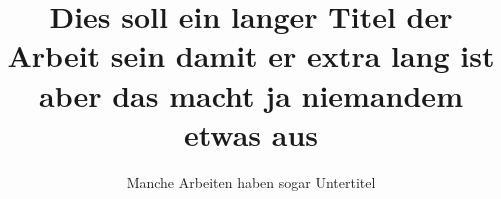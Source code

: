 \documentclass[online,a4paper]{isw}
\begin{document}
    \frontmatter
    
    \maketitle
    
    \begin{otherlanguage}{ngerman}
        \title{Dies soll ein langer Titel der Arbeit sein damit er extra lang ist aber das macht ja niemandem etwas aus}
        \subtitle{Manche Arbeiten haben sogar Untertitel}
        \maketitle
    \end{otherlanguage}
    
    
    
    \begin{thesisabstract}
        \lipsum
    \end{thesisabstract}
    
    \begin{otherlanguage}{ngerman}
        \begin{thesisabstract}
            \lipsum
        \end{thesisabstract}
    \end{otherlanguage}
    
    \tableofcontents
    \listoffigures
    \listoftables
    
\end{document}
